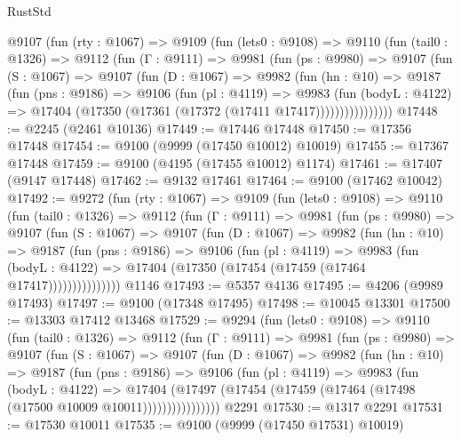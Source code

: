 \begin{lexlean}{RustStd}
\begin{coremodule}
    @9107
      (fun (rty : @1067) =>
      @9109
        (fun (lets0 : @9108) =>
        @9110
          (fun (tail0 : @1326) =>
          @9112
            (fun (Γ : @9111) =>
            @9981
              (fun (ps : @9980) =>
              @9107
                (fun (S : @1067) =>
                @9107
                  (fun (D : @1067) =>
                  @9982
                    (fun (hn : @10) =>
                    @9187
                      (fun (pns : @9186) =>
                      @9106
                        (fun (pl : @4119) =>
                        @9983
                          (fun (bodyL : @4122) =>
                          @17404 (@17350 (@17361 (@17372 (@17411 @17417))))))))))))))))
@17448 := @2245 (@2461 @10136)
@17449 := @17446 @17448
@17450 := @17356 @17448
@17454 := @9100 (@9999 (@17450 @10012) @10019)
@17455 := @17367 @17448
@17459 := @9100 (@4195 (@17455 @10012) @1174)
@17461 := @17407 (@9147 @17448)
@17462 := @9132 @17461
@17464 := @9100 (@17462 @10042)
@17492 := @9272
    (fun (rty : @1067) =>
    @9109
      (fun (lets0 : @9108) =>
      @9110
        (fun (tail0 : @1326) =>
        @9112
          (fun (Γ : @9111) =>
          @9981
            (fun (ps : @9980) =>
            @9107
              (fun (S : @1067) =>
              @9107
                (fun (D : @1067) =>
                @9982
                  (fun (hn : @10) =>
                  @9187
                    (fun (pns : @9186) =>
                    @9106
                      (fun (pl : @4119) =>
                      @9983
                        (fun (bodyL : @4122) =>
                        @17404 (@17350 (@17454 (@17459 (@17464 @17417)))))))))))))))
    @1146
@17493 := @5357 @4136
@17495 := @4206 (@9989 @17493)
@17497 := @9100 (@17348 @17495)
@17498 := @10045 @13301
@17500 := @13303 @17412 @13468
@17529 := @9294
    (fun (lets0 : @9108) =>
    @9110
      (fun (tail0 : @1326) =>
      @9112
        (fun (Γ : @9111) =>
        @9981
          (fun (ps : @9980) =>
          @9107
            (fun (S : @1067) =>
            @9107
              (fun (D : @1067) =>
              @9982
                (fun (hn : @10) =>
                @9187
                  (fun (pns : @9186) =>
                  @9106
                    (fun (pl : @4119) =>
                    @9983
                      (fun (bodyL : @4122) =>
                      @17404
                        (@17497
                          (@17454 (@17459 (@17464 (@17498 (@17500 @10009 @10011))))))))))))))))
    @2291
@17530 := @1317 @2291
@17531 := @17530 @10011
@17535 := @9100 (@9999 (@17450 @17531) @10019)

\end{coremodule}
\end{lexlean}
